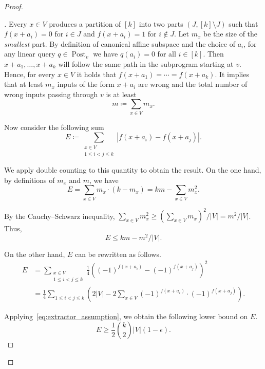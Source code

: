 \documentclass[a4paper,11pt,draft]{article}
\theoremstyle{definition}
\theoremstyle{remark}
\newenvironment{claimproof}[1][\proofname]{\begin{proof}[#1]\renewcommand*{\qedsymbol}{$\blacksquare$}}{\end{proof}}
\DeclareMathOperator{\post}{Post}
\newcommand{\card}[1]{{\left|#1\right|}}
\begin{document}
\begin{proof}
\begin{claimproof}
    Every $x \in V$ produces a partition of $[k]$ into two parts $(J, [k] \setminus J)$ such that $f(x+a_i) = 0$ for $i \in J$ and $f(x+a_i) = 1$ for $i \not\in J$. Let $m_x$ be the size of the \emph{smallest} part.
    By definition of canonical affine subspace and the choice of $a_i$, for any linear query $q \in \post_v$ we have $q(a_i) = 0$ for all $i \in [k]$. Then $x+a_1, \ldots, x+a_k$ will follow the same path in the subprogram starting at $v$. Hence, for every $x \in V$ it holds that $f(x+a_1) = \cdots = f(x+a_k)$. It implies that at least $m_x$ inputs of the form $x+a_i$ are wrong and the total number of wrong inputs passing through $v$ is at least
    \[
      m \coloneqq \sum_{x \in V} m_x.
    \]
  
    Now consider the following sum
    \[
      E \coloneqq
      \sum_{\substack{x \in V \\ 1\le i<j \le k}} |f(x+a_i) - f(x+a_j)|.
    \]

    We apply double counting to this quantity to obtain the result.
    On the one hand, by definitions of $m_x$ and $m$, we have
    \begin{equation*}
      E = \sum_{x \in V} m_x \cdot (k - m_x) = k m - \sum_{x \in V} m_x^2.
    \end{equation*}
  
    By the Cauchy--Schwarz inequality, $\sum_{x \in V} m_x^2 \ge {\left(\sum_{x \in V} m_x\right)}^2 / \card{V} = m^2/\card{V}$. Thus,
    \begin{equation}\label{eq:bad_inputs_upper_bound}
      E \le km-m^2/\card{V}.
    \end{equation}
  
    On the other hand, $E$ can be rewritten as follows.
    \begin{equation*}
      \begin{aligned}
        E &=
        \sum_{\substack{x \in V \\ 1\le i<j \le k}} \frac{1}{4} {\left({(-1)}^{f(x+a_i)} - {(-1)}^{f(x+a_j)}\right)}^2 \\ &=
        \frac{1}{4} \sum_{1 \le i < j \le k} \left( 2\card{V} - 2\sum_{x\in V} {(-1)}^{f(x+a_i)} \cdot {(-1)}^{f(x+a_j)}\right).
      \end{aligned}
    \end{equation*}

    Applying~\eqref{eq:extractor_assumption}, we obtain the following lower bound on $E$.
    \begin{equation}\label{eq:bad_inputs_lower_bound}
      E \ge \frac{1}{2} \binom{k}{2} \card{V} (1-\epsilon).
    \end{equation}
  

\end{claimproof}
\end{proof}
\end{document}
